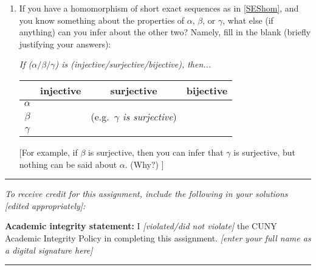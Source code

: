 \documentclass[11pt, reqno]{amsart}
\theoremstyle{plain}
\theoremstyle{definition}
\theoremstyle{example}
\begin{document}
\begin{enumerate}[1.]
\begin{enumerate}
\item If you have a homomorphism of short exact sequences as in \eqref{SEShom}, and you know something about the properties of $\alpha$, $\beta$, or $\gamma$, what else (if anything) can you infer about the other two? Namely, fill in the blank (briefly justifying your answers):

\begin{center}
\emph{If  ($\alpha/\beta/\gamma$) is (injective/surjective/bijective), then...}

{\def\arraystretch{1.3}\begin{tabular}{|c||c|c|c|}\hline
 & injective & surjective & bijective\\\hline\hline
 $\alpha$ &&&\\\hline
 $\beta$ && (e.g.\ \emph{$\gamma$ is surjective})&\\\hline
 $\gamma$ &&& \\\hline
\end{tabular}}
\end{center}

{[For example, if $\beta$ is surjective, then you can infer that $\gamma$ is surjective, but nothing can be said about $\alpha$. (Why?)
]}


\end{enumerate}
\end{enumerate}

\vfill


\hrule
\emph{\small To receive credit for this assignment, include the following in your solutions [edited appropriately]:}

\smallskip

\textbf{Academic integrity statement:} I \emph{[violated/did not violate]} the CUNY Academic Integrity Policy in completing this assignment. \hfill \emph{[enter your full name as a digital signature here]}

\medskip
\hrule

\vfill
\end{document}
